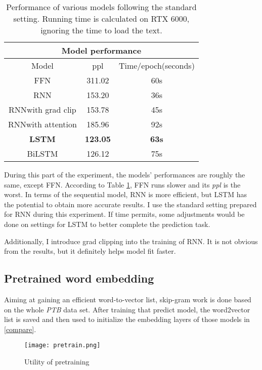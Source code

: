 \documentclass[11pt,a4paper]{article}
\begin{document}
\begin{table}[h]
\centering
\begin{tabular}{ccc} 
\hline
\multicolumn{3}{c}{Model
  performance}               \\ 
\hline
Model                  & ppl     & Time/epoch(seconds)   \\
FFN                    & 311.02 & 60s                   \\
RNN                    & 153.20 & 36s                   \\
RNN\footnotesize{with grad clip} & 153.78 & 45s          \\
RNN\footnotesize{with attention} & 185.96 & 92s          \\
\textbf{LSTM}                    & \textbf{123.05} & \textbf{63s}                   \\
BiLSTM                 & 126.12 & 75s                   \\
\hline
\end{tabular}
\caption{\label{model-table} Performance of various models following the standard setting. Running time is calculated on RTX 6000, ignoring the time to load the text.}
\end{table}

During this part of the experiment, the models' performances are roughly the same, except FFN.
According to Table \ref{model-table}, FFN runs slower and its \emph{ppl} is the worst. 
In terms of the sequential model, RNN is more efficient, but LSTM has the potential to obtain more accurate results. 
I use the standard setting prepared for RNN during this experiment. If time permits, some adjustments would be done on settings for LSTM to better complete the prediction task.

Additionally, I introduce grad clipping into the training of RNN. It is not obvious from the results, but it definitely helps model fit faster.

\subsection{Pretrained word embedding}
Aiming at gaining an efficient word-to-vector list, skip-gram work is done based on the whole \emph{PTB} data set. After training that predict model, the word2vector list is saved and then used to initialize the embedding layers of those models in \ref{compare}.

\begin{figure}[H] %
\centering 
\texttt{[image: pretrain.png]} %
\caption{Utility of pretraining} 
\label{pic1}
\end{figure}
\end{document}
